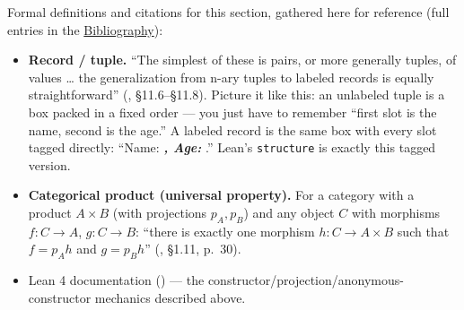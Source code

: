 Formal definitions and citations for this section, gathered here for reference (full entries in the \hyperref[sec:root:bibliography:1]{Bibliography}):

\begin{itemize}
\tightlist
\item
  \textbf{Record / tuple.} ``The simplest of these is pairs, or more generally tuples, of values \ldots{} the generalization from n-ary tuples to labeled records is equally straightforward'' (\cite{Pierce2002}, §11.6--§11.8). Picture it like this: an unlabeled tuple is a box packed in a fixed order --- you just have to remember ``first slot is the name, second is the age.'' A labeled record is the same box with every slot tagged directly: ``Name: \textbf{\emph{, Age: }}.'' Lean's \texttt{structure} is exactly this tagged version.
\item
  \textbf{Categorical product (universal property).} For a category with a product \(A \times B\) (with projections \(p_A, p_B\)) and any object \(C\) with morphisms \(f : C \to A\), \(g : C \to B\): ``there is exactly one morphism \(h : C \to A \times B\) such that \(f = p_A h\) and \(g = p_B h\)'' (\cite{Pareigis1970}, §1.11, p.~30).
\item
  Lean 4 documentation (\cite{LeanDocs}) --- the constructor/projection/anonymous-constructor mechanics described above.
\end{itemize}
